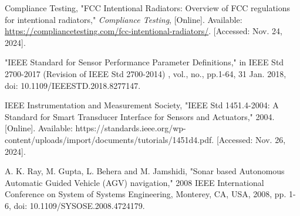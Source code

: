 \begin{thebibliography}{45}
	Compliance Testing, "FCC Intentional Radiators: Overview of FCC regulations for intentional radiators," \textit{Compliance Testing}, [Online]. Available: \url{https://compliancetesting.com/fcc-intentional-radiators/}. [Accessed: Nov. 24, 2024].
	
	"IEEE Standard for Sensor Performance Parameter Definitions," in IEEE Std 2700-2017 (Revision of IEEE Std 2700-2014) , vol., no., pp.1-64, 31 Jan. 2018, doi: 10.1109/IEEESTD.2018.8277147.
	
	IEEE Instrumentation and Measurement Society, "IEEE Std 1451.4-2004: A Standard for Smart Transducer Interface for Sensors and Actuators," 2004. [Online]. Available: https://standards.ieee.org/wp-content/uploads/import/documents/tutorials/1451d4.pdf. [Accessed: Nov. 26, 2024].
	
	A. K. Ray, M. Gupta, L. Behera and M. Jamshidi, "Sonar based Autonomous Automatic Guided Vehicle (AGV) navigation," 2008 IEEE International Conference on System of Systems Engineering, Monterey, CA, USA, 2008, pp. 1-6, doi: 10.1109/SYSOSE.2008.4724179. 
	
\end{thebibliography}
